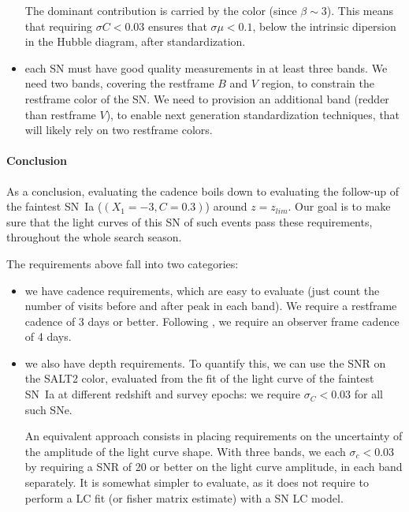 \documentclass[\docopts]{\docclass}
\begin{document}
\begin{itemize}
  The dominant contribution is carried by the color (since
  $\beta \sim 3$). This means that requiring $\sigma C < 0.03$ ensures
  that $\sigma \mu < 0.1$, below the intrinsic dipersion in the Hubble
  diagram, after standardization.

\item each SN must have good quality measurements in at least three
  bands. We need two bands, covering the restframe $B$ and $V$ region,
  to constrain the restframe color of the SN. We need to provision an
  additional band (redder than restframe $V$), to enable next
  generation standardization techniques, that will likely rely on two
  restframe colors.
\end{itemize}


\paragraph{Conclusion} As a conclusion, evaluating the cadence boils
down to evaluating the follow-up of the faintest SN~Ia ($(X_1=-3,
C=0.3)$) around $z = z_{lim}$. Our goal is to make sure that the light
curves of this SN of such events pass these requirements, throughout
the whole search season.

The requirements above fall into two categories: 
\begin{itemize}
\item we have  cadence requirements, which are easy  to evaluate (just
  count the number of visits before  and after peak in each band).  We
  require  a  restframe  cadence  of  3  days  or  better.   Following
  \cite{2014A&A...572A..80A}, we require an  observer frame cadence of
  4 days.

\item we also have depth requirements.  To quantify this, we can use
  the SNR on the SALT2 color, evaluated from the fit of the light
  curve of the faintest SN~Ia at different redshift and survey epochs:
  we require $\sigma_C < 0.03$ for all such SNe.

  An equivalent approach consists in placing requirements on the
  uncertainty of the amplitude of the light curve shape.  With three
  bands, we each $\sigma_c < 0.03$ by requiring a SNR of 20 or better
  on the light curve amplitude, in each band separately.  It is
  somewhat simpler to evaluate, as it does not require to perform a LC
  fit (or fisher matrix estimate) with a SN LC model.
\end{itemize}

\end{document}
